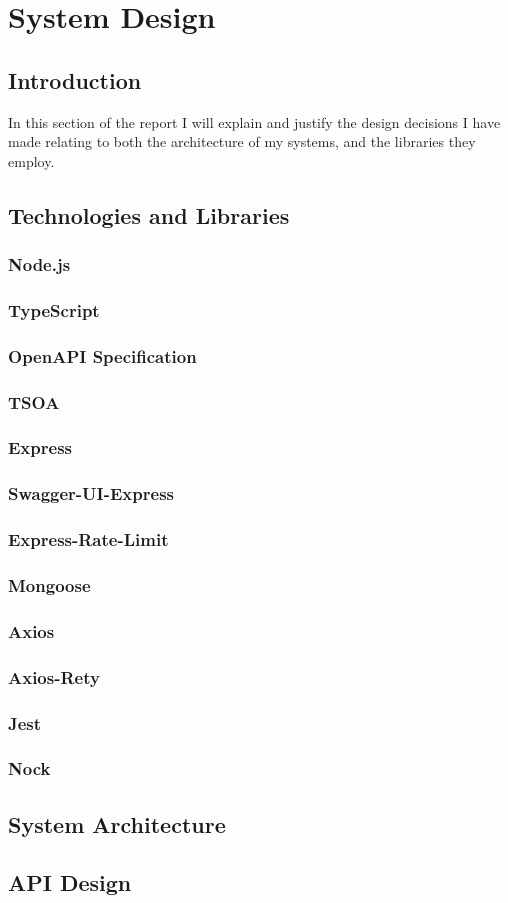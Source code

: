 \chapter{System Design}
\section{Introduction}
In this section of the report I will explain and justify the design decisions I have made relating to both the architecture of my systems, and the libraries they employ.
\section{Technologies and Libraries}
    \subsection{Node.js}
    \subsection{TypeScript}
    \subsection{OpenAPI Specification}
    \subsection{TSOA}
    \subsection{Express}
    \subsection{Swagger-UI-Express}
    \subsection{Express-Rate-Limit}
    \subsection{Mongoose}
    \subsection{Axios}
    \subsection{Axios-Rety}
    \subsection{Jest}
    \subsection{Nock}
\section{System Architecture}
\section{API Design}